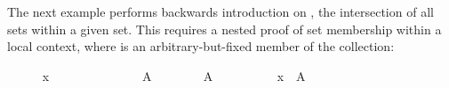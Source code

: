 \begin{isabellebody}
\begin{isamarkuptext}
  The next example performs backwards introduction on ,
  the intersection of all sets within a given set.  This requires a
  nested proof of set membership within a local context, where  is an arbitrary-but-fixed member of the collection:%
\end{isamarkuptext}%
\isamarkuptrue%
%
\medskip\begin{minipage}{0.6\textwidth}
%
\isadelimproof
\ \ \ \ %
\endisadelimproof
%
\isatagproof
{}\isamarkupfalse%
\ {}x\ {}\ {}{}{}\isanewline
\ \ \ \ \isamarkupfalse%
\isanewline
\ \ \ \ \ \ \isamarkupfalse%
\ A\isanewline
\ \ \ \ \ \ \isamarkupfalse%
\ {}A\ {}\ {}{}\isanewline
\ \ \ \ \ \ \isamarkupfalse%
\ {}x\ {}\ A{}%
\endisatagproof
{\isafoldproof}%
%
\isadelimproof
%
\endisadelimproof
%
\isadelimnoproof
\ %
\endisadelimnoproof
%
\isatagnoproof
{}\isamarkupfalse%
%
\endisatagnoproof
{\isafoldnoproof}%
%
\isadelimnoproof
%
\endisadelimnoproof
\isanewline
%
\isadelimproof
\ \ \ \ %
\endisadelimproof
%
\isatagproof
{}\isamarkupfalse%
%
\endisatagproof
{\isafoldproof}%
%
\isadelimproof
%
\endisadelimproof
%
\end{minipage}\begin{minipage}{0.4\textwidth}
%
\begin{isamarkuptext}%
%

\end{isamarkuptext}
\end{minipage}
\end{isabellebody}
